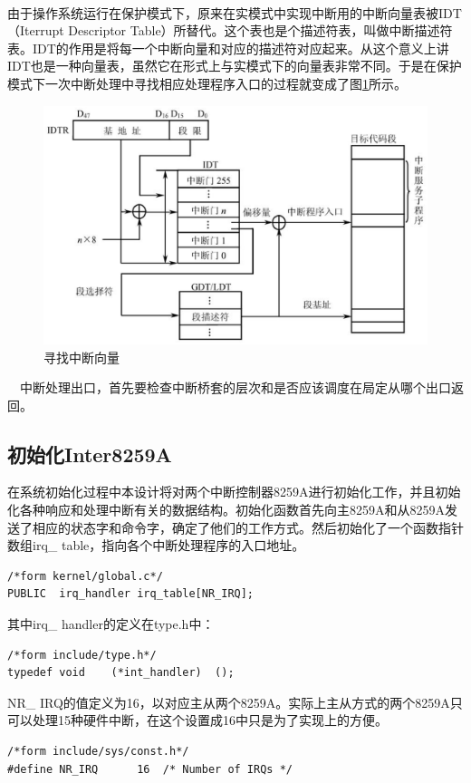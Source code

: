 \documentclass[UTF8,nofonts,cs4size]{ctexrep}
\begin{document}
\\
\indent  由于操作系统运行在保护模式下，原来在实模式中实现中断用的中断向量表被IDT（Iterrupt Descriptor Table）所替代。这个表也是个描述符表，叫做中断描述符表。IDT的作用是将每一个中断向量和对应的描述符对应起来。从这个意义上讲IDT也是一种向量表，虽然它在形式上与实模式下的向量表非常不同。于是在保护模式下一次中断处理中寻找相应处理程序入口的过程就变成了图\ref{interruptslove}所示。
\begin{figure}[htp]
\centering
\includegraphics[scale=0.4]{interruptslove.eps}
\caption{寻找中断向量}
\label{interruptslove}
\end{figure}
\indent \ \ 
中断处理出口，首先要检查中断桥套的层次和是否应该调度在局定从哪个出口返回。
\subsection{初始化Inter8259A}
在系统初始化过程中本设计将对两个中断控制器8259A进行初始化工作，并且初始化各种响应和处理中断有关的数据结构。初始化函数首先向主8259A和从8259A发送了相应的状态字和命令字，确定了他们的工作方式。然后初始化了一个函数指针数组irq\_ table，指向各个中断处理程序的入口地址。
\begin{lstlisting}
/*form kernel/global.c*/
PUBLIC	irq_handler	irq_table[NR_IRQ];
\end{lstlisting}
其中irq\_ handler的定义在type.h中：
\begin{lstlisting}
/*form include/type.h*/
typedef	void	(*int_handler)	();
\end{lstlisting}
NR\_ IRQ的值定义为16，以对应主从两个8259A。实际上主从方式的两个8259A只可以处理15种硬件中断，在这个设置成16中只是为了实现上的方便。
\begin{lstlisting}
/*form include/sys/const.h*/
#define	NR_IRQ		16	/* Number of IRQs */
\end{lstlisting}
\end{document}
